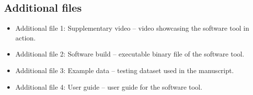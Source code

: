 \documentclass[twocolumn]{bmcart}%
\begin{document}
\begin{backmatter}






\section*{Additional files}
\begin{itemize}
\item Additional file 1: Supplementary video -- video showcasing the software tool in action.
\item Additional file 2: Software build -- executable binary file of the software tool.
\item Additional file 3: Example data -- testing dataset used in the manuscript.
\item Additional file 4: User guide -- user guide for the software tool.
\end{itemize}

\end{backmatter}
\end{document}
